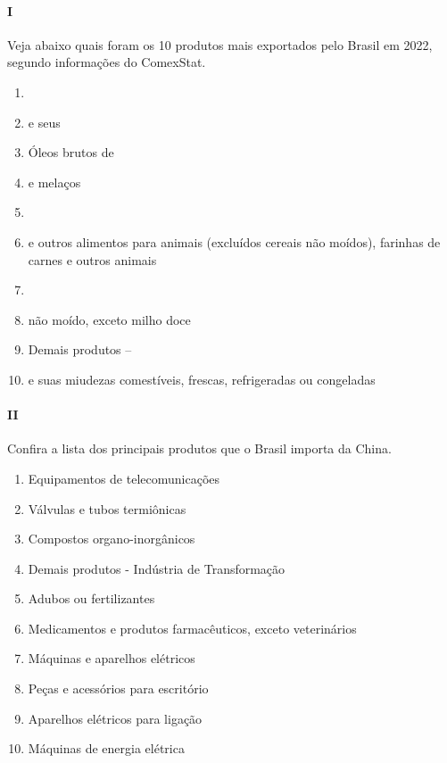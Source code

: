 \paragraph{I} Veja abaixo quais foram os 10 produtos mais exportados pelo Brasil em
2022, segundo informações do ComexStat.

\begin{enumerate}
\item {}
\item {} e seus
\item Óleos brutos de 
\item {} e melaços
\item {}
\item {} e outros alimentos para animais (excluídos cereais não
  moídos), farinhas de carnes e outros animais
\item {}
\item {} não moído, exceto milho doce
\item Demais produtos -- 
\item {} e suas miudezas comestíveis, frescas, refrigeradas ou congeladas
\end{enumerate}


\paragraph{II} Confira a lista dos principais produtos que o Brasil importa da China.

\begin{enumerate}
\item
  Equipamentos de telecomunicações
\item
  Válvulas e tubos termiônicas
\item
  Compostos organo-inorgânicos
\item
  Demais produtos - Indústria de Transformação
\item
  Adubos ou fertilizantes
\item
  Medicamentos e produtos farmacêuticos, exceto veterinários
\item
  Máquinas e aparelhos elétricos
\item
  Peças e acessórios para escritório
\item
  Aparelhos elétricos para ligação
\item
  Máquinas de energia elétrica
\end{enumerate}

